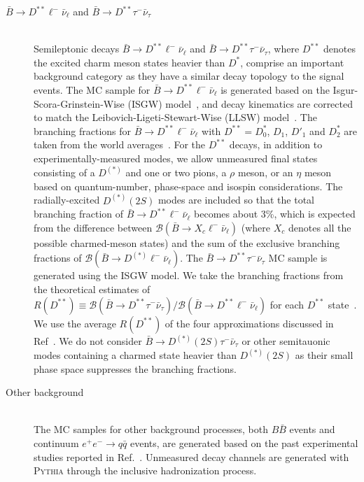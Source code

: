 \documentclass[aps,prd,twocolumn,superscriptaddress,showpacs,preprintnumbers,amsmath,amssymb]{revtex4-1}
\begin{document}
\begin{description}
\item[\textbf{\boldmath${\bar B} \rightarrow D^{**} \ell^- \bar{\nu}_\ell$} and \textbf{\boldmath${\bar B} \rightarrow D^{**} \tau^- \bar{\nu}_\tau$}]\mbox{}\\
  Semileptonic decays ${\bar B} \rightarrow D^{**} \ell^- {\bar \nu_{\ell}}$ and ${\bar B} \rightarrow D^{**} \tau^- {\bar \nu_{\tau}}$, where $D^{**}$ denotes the excited charm meson states heavier than $D^*$, comprise an important background category as they have a similar decay topology to the signal events. The MC sample for ${\bar B} \rightarrow D^{**} \ell^- \bar{\nu}_\ell$ is generated based on the Isgur-Scora-Grinstein-Wise (ISGW) model~\cite{cite:ISGW2:1995}, and decay kinematics are corrected to match the Leibovich-Ligeti-Stewart-Wise (LLSW) model~\cite{cite:LLSW:1998}. The branching fractions for $\bar{B} \rightarrow D^{**} \ell^- \bar{\nu}_\ell$ with $D^{**} = D_0^*$, $D_1$, $D'_1$ and $D_2^*$ are taken from the world averages~\cite{cite:HFLAV:2014}. For the $D^{**}$ decays, in addition to experimentally-measured modes, we allow unmeasured final states consisting of a $D^{(*)}$ and one or two pions, a $\rho$ meson, or an $\eta$ meson based on quantum-number, phase-space and isospin considerations. The radially-excited $D^{(*)}(2S)$ modes are included so that the total branching fraction of $\bar{B} \rightarrow D^{**} \ell^- \bar{\nu}_\ell$ becomes about 3\%, which is expected from the difference between $\mathcal{B}(\bar{B} \rightarrow X_c \ell^- \bar{\nu}_\ell)$ (where $X_c$ denotes all the possible charmed-meson states) and the sum of the exclusive branching fractions of $\mathcal{B}(\bar{B} \rightarrow D^{(*)} \ell^- \bar{\nu}_\ell)$. The ${\bar B} \rightarrow D^{**} \tau^- \bar{\nu}_\tau$ MC sample is generated using the ISGW model. We take the branching fractions from the theoretical estimates of $R(D^{**}) \equiv \mathcal{B}(\bar{B} \rightarrow D^{**} \tau^- \bar{\nu}_\tau) / \mathcal{B}(\bar{B} \rightarrow D^{**} \ell^- \bar{\nu}_\ell)$ for each $D^{**}$ state~\cite{cite:RDstst:2017}. We use the average $R(D^{**})$ of the four approximations discussed in Ref~\cite{cite:RDstst:2017}. We do not consider $\bar{B} \rightarrow D^{(*)}(2S) \tau^- \bar{\nu}_\tau$ or other semitauonic modes containing a charmed state heavier than $D^{(*)}(2S)$ as their small phase space suppresses the branching fractions. 

\item[Other background]\mbox{}\\
  The MC samples for other background processes, both $B \bar{B}$ events and continuum $e^+ e^- \rightarrow q{\bar q}$ events, are generated based on the past experimental studies reported in Ref.~\cite{cite:PDG:2016}. Unmeasured decay channels are generated with \textsc{Pythia} through the inclusive hadronization process.
\end{description}
\end{document}
